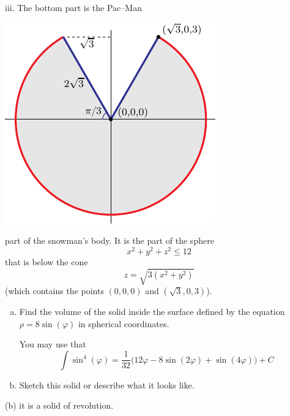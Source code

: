 \begin{solution}
iii. The bottom part is the Pac--Man
\begin{center}
     \includegraphics{fig/OE11D_8f.pdf}
\end{center}
part of the snowman's body. It is the part of the sphere
\begin{equation*}
x^2+y^2+z^2\le 12
\end{equation*}
that is below the cone
\begin{equation*}
z = \sqrt{3(x^2+y^2)}
\end{equation*}
(which contains the points $(0,0,0)$ and $(\sqrt{3},0,3)$).
\end{solution}

\begin{question}[M200 2013D] %
\begin{enumerate}[(a)]
\item
Find the volume of the solid inside the surface defined by the equation 
$\rho = 8 \sin(\varphi)$ in spherical coordinates.

You may use that
\begin{equation*}
\int \sin^4(\varphi) =\frac{1}{32}\big(12\varphi -8\sin(2\varphi)
+\sin(4\varphi)\big) +C
\end{equation*}

\item
Sketch this solid or describe what it looks like. 
\end{enumerate}
\end{question}

\begin{hint}
(b) it is a solid of revolution.
\end{hint}

